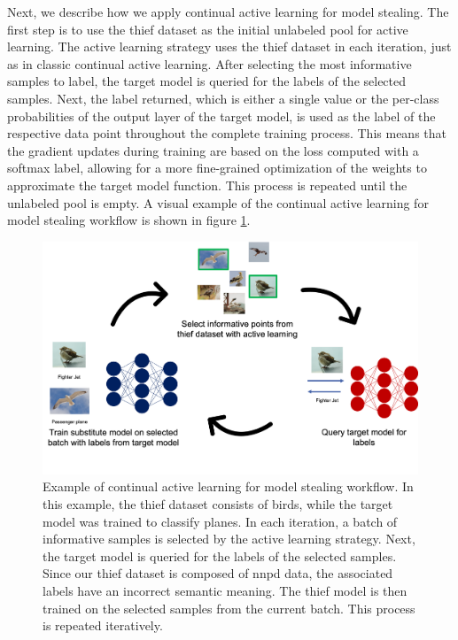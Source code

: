 Next, we describe how we apply continual active learning for model stealing. The first step is to use the thief dataset as the initial unlabeled pool for
active learning. The active learning strategy uses the thief dataset in each iteration, just as in classic continual active learning. After selecting the
most informative samples to label, the target model is queried for the labels of the selected samples. Next, the label returned, which is either a single
value or the per-class probabilities of the output layer of the target model, is used as the label of the respective data point throughout the complete
training process. This means that the gradient updates during training are based on the loss computed with a softmax label, allowing for a more fine-grained
optimization of the weights to approximate the target model function. This
process is repeated until the unlabeled pool is empty. A visual example of the continual active learning for model stealing workflow is shown in figure
\ref{fig:CalmsWorkflow}. \par
\begin{figure}[ht]
    \centering
    \includegraphics[width=.7\linewidth]{images/Calms_workflow.png}
    \caption[Continual active learning for model stealing workflow]{Example of continual active learning for model stealing workflow. In this example, the thief
    dataset consists of birds, while the target model was trained to classify planes. In each iteration, a batch of informative samples is selected by the active learning
    strategy. Next, the target model is queried for the labels of the selected samples. Since our thief dataset is composed of \gls{nnpd} data, the associated labels have
    an incorrect semantic meaning. The thief model is then trained on the selected samples from the current batch. This process is repeated iteratively.}
    \label{fig:CalmsWorkflow}
\end{figure}



